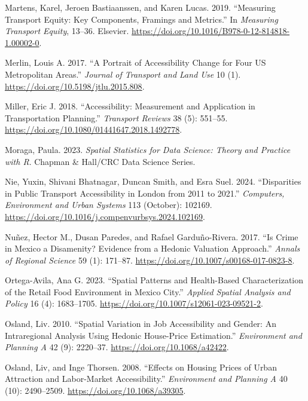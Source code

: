 \documentclass{article}
\newlength{\cslhangindent}
\newenvironment{CSLReferences}[2] %
 {\begin{list}{}{%
  \setlength{\itemindent}{0pt}
  \setlength{\leftmargin}{0pt}
  \setlength{\parsep}{0pt}
  \ifodd #1
   \setlength{\leftmargin}{\cslhangindent}
   \setlength{\itemindent}{-1\cslhangindent}
  \fi
  \setlength{\itemsep}{#2\baselineskip}}}
 {\end{list}}
\begin{document}
\begin{CSLReferences}{1}{0}
Martens, Karel, Jeroen Bastiaanssen, and Karen Lucas. 2019. {``Measuring
Transport Equity: {Key} Components, Framings and Metrics.''} In
\emph{Measuring {Transport Equity}}, 13--36. Elsevier.
\url{https://doi.org/10.1016/B978-0-12-814818-1.00002-0}.

Merlin, Louis A. 2017. {``A Portrait of Accessibility Change for Four
{US} Metropolitan Areas.''} \emph{Journal of Transport and Land Use} 10
(1). \url{https://doi.org/10.5198/jtlu.2015.808}.

Miller, Eric J. 2018. {``Accessibility: Measurement and Application in
Transportation Planning.''} \emph{Transport Reviews} 38 (5): 551--55.
\url{https://doi.org/10.1080/01441647.2018.1492778}.

Moraga, Paula. 2023. \emph{Spatial {Statistics} for {Data Science}:
{Theory} and {Practice} with {R}}. Chapman \& Hall/CRC Data Science
Series.

Nie, Yuxin, Shivani Bhatnagar, Duncan Smith, and Esra Suel. 2024.
{``Disparities in Public Transport Accessibility in {London} from 2011
to 2021.''} \emph{Computers, Environment and Urban Systems} 113
(October): 102169.
\url{https://doi.org/10.1016/j.compenvurbsys.2024.102169}.

Nuñez, Hector M., Dusan Paredes, and Rafael Garduño-Rivera. 2017. {``Is
Crime in {Mexico} a Disamenity? {Evidence} from a Hedonic Valuation
Approach.''} \emph{Annals of Regional Science} 59 (1): 171--87.
\url{https://doi.org/10.1007/s00168-017-0823-8}.

Ortega-Avila, Ana G. 2023. {``Spatial {Patterns} and {Health-Based
Characterization} of the {Retail Food Environment} in {Mexico City}.''}
\emph{Applied Spatial Analysis and Policy} 16 (4): 1683--1705.
\url{https://doi.org/10.1007/s12061-023-09521-2}.

Osland, Liv. 2010. {``Spatial Variation in Job Accessibility and Gender:
{An} Intraregional Analysis Using Hedonic House-Price Estimation.''}
\emph{Environment and Planning A} 42 (9): 2220--37.
\url{https://doi.org/10.1068/a42422}.

Osland, Liv, and Inge Thorsen. 2008. {``Effects on Housing Prices of
Urban Attraction and Labor-Market Accessibility.''} \emph{Environment
and Planning A} 40 (10): 2490--2509.
\url{https://doi.org/10.1068/a39305}.


\end{CSLReferences}
\end{document}
